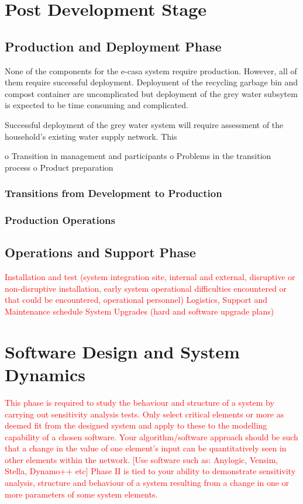 \documentclass[a4paper,11pt,fleqn]{report}
\begin{document}
\chapter{Post Development Stage}

\section{Production and Deployment Phase}
None of the components for the \ac{e-casa} system require production. However, all of them require successful deployment. Deployment of the recycling garbage bin and compost container are uncomplicated but deployment of the grey water subsytem is expected to be time consuming and complicated. 

Successful deployment of the grey water system will require assessment of the household's existing water supply network. This 

o Transition in management and participants o Problems in the transition process
o Product preparation

\subsection{Transitions from Development to Production}

\subsection{Production Operations}

\section{Operations and Support Phase}
\textcolor{red}{Installation and test (system integration site, internal and external, disruptive or non-disruptive installation, early system operational difficulties encountered or that could be encountered, operational personnel)
Logistics, Support and Maintenance schedule
System Upgrades (hard and software upgrade plans)}



\chapter{Software Design and System Dynamics}
\textcolor{red}{This phase is required to study the behaviour and structure of a system by carrying out sensitivity analysis tests. Only select critical elements or more as deemed fit from the designed system and apply to these to the modelling capability of a chosen software.
Your algorithm/software approach should be such that a change in the value of one element’s input can be quantitatively seen in other elements within the network. [Use software such as: Anylogic, Vensim, Stella, Dynamo++ etc]
Phase II is tied to your ability to demonstrate sensitivity analysis, structure and behaviour of a system resulting from a change in one or more parameters of some system elements.}
\end{document}
